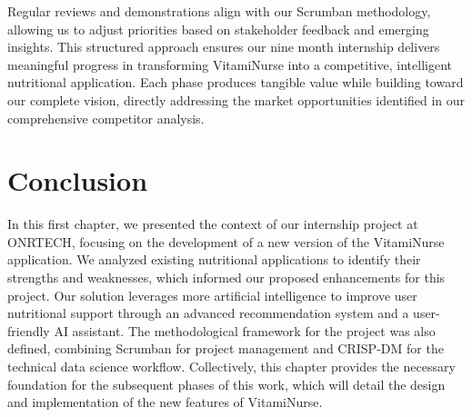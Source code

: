 Regular reviews and demonstrations align with our Scrumban methodology, allowing us to adjust priorities based on stakeholder feedback and emerging insights. This structured approach ensures our nine month internship delivers meaningful progress in transforming VitamiNurse into a competitive, intelligent nutritional application. 
Each phase produces tangible value while building toward our complete vision, directly addressing the market opportunities identified in our comprehensive competitor analysis.


\section*{Conclusion}
In this first chapter, we presented the context of our internship project
at ONRTECH, focusing on the development of a new version of the VitamiNurse application.
We analyzed existing nutritional applications to identify their
strengths and weaknesses, which informed our proposed enhancements
for this project. Our solution leverages more artificial intelligence to
improve user nutritional support through an advanced recommendation system and a
user-friendly AI assistant. The methodological framework for the project was also defined,
 combining Scrumban for project management and CRISP-DM for the technical data science workflow. 
 Collectively, this chapter provides the necessary foundation for the subsequent phases of this work, 
 which will detail the design and implementation of the new features of VitamiNurse.